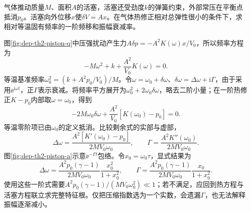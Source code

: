 \begin{example}[热弛豫造成的活塞阻尼]
气体推动质量$M$、面积$A$的活塞，活塞还受劲度$k$的弹簧约束，外部常压在平衡点抵消$p_0$。活塞向外位移$x$使$\delta V=Ax$。在气体热修正相对总弹性很小的条件下，求相对等温固有频率的一阶频移和振幅衰减率。
\end{example}
\begin{solution}
图\ref{fig:dep-th2-piston-q}中压强扰动产生力$A\delta p=-A^2K(\omega)x/V_0$，所以频率方程为
\[
 -M\omega^2+k+\frac{A^2}{V_0}K(\omega)=0.
\]
等温基准频率$\omega_0^2=(k+A^2p_0/V_0)/M$。令$\omega=\omega_0+\delta\omega$、$\delta\omega=\Delta\omega+\mathrm i\Gamma$，由于采用$\ee^{\mathrm i\omega t}$，正$\Gamma$表示衰减。将频率平方展开为$\omega_0^2+2\omega_0\delta\omega$，略去二阶小量；在一阶热修正$K-p_0$内部取$\omega=\omega_0$，得到
\[
 -2M\omega_0\delta\omega+
 \frac{A^2}{V_0}[K(\omega_0)-p_0]=0.
\]
等温零阶项已由$\omega_0$的定义抵消。比较剩余式的实部与虚部，
\[
 \Delta\omega=\frac{A^2[K'(\omega_0)-p_0]}{2MV_0\omega_0},
 \qquad\Gamma=\frac{A^2K''(\omega_0)}{2MV_0\omega_0}.
\]
图\ref{fig:dep-th2-piston-a}示意$\ee^{-\Gamma t}$包络。令$x_0=\omega_0\tau$，显式结果为
\[
 \Delta\omega=\frac{A^2p_0(\gamma-1)}{2MV_0\omega_0}
 \frac{x_0^2}{1+x_0^2},\qquad
 \Gamma=\frac{A^2p_0(\gamma-1)}{2MV_0\omega_0}
 \frac{x_0}{1+x_0^2}.
\]
使用这些一阶式需要$A^2p_0(\gamma-1)/(MV_0\omega_0^2)\ll1$；若不满足，应回到热方程与活塞方程联立求完整特征根。仅把压缩指数选为一个实数，会遗漏$\Gamma$，也无法解释振幅逐渐减小。
\end{solution}
